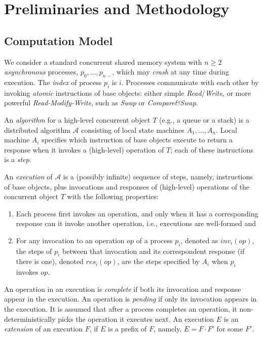 \chapter{\label{chapter:preliminaries}Preliminaries and Methodology}

\section{\label{sec:computation-model}Computation Model}

We consider a standard concurrent shared memory system with \(n \ge 2\) \textit{asynchronous} processes, \(p_0, \ldots, p_{n-}\), which may \textit{crash} at any time during execution. The \textit{index} of process \(p_i\) is \(i\). Processes communicate with each other by invoking \textit{atomic} instructions of base objects: either simple \emph{Read}/\emph{Write}, or more powerful \emph{Read-Modify-Write}, such as \emph{Swap} or \emph{Compare\&Swap}.

An \emph{algorithm} for a high-level concurrent object \(T\) (e.g., a queue or a stack) is a distributed algorithm \(\mathcal{A}\) consisting of local state machines \(A_1,\ldots, A_n\). Local machine \(A_i\) specifies which instruction of base objects execute to return a response when it invokes a (high-level) operation of \(T\); each of these instructions is a \emph{step}.

An \emph{execution} of \(\mathcal{A}\) is a (possibly infinite) sequence of steps, namely, instructions of base objects, plus invocations and responses of (high-level) operations of the concurrent object \(T\) with the following properties:

\begin{enumerate}
    \item Each process first invokes an operation, and only when it has a corresponding response can it invoke another operation, i.e., executions are well-formed and
    \item For any invocation to an operation \(op\) of a process \(p_i\), denoted as \(inv_i(op)\), the steps of \(p_i\) between that invocation and its correspondent response (if there is one), denoted \(res_i(op)\), are the steps specified by \(A_i\) when \(p_i\) invokes \(op\).
\end{enumerate}

An operation in an execution is \emph{complete} if both its invocation and response appear in the execution. An operation is \emph{pending} if only its invocation appears in the execution. It is assumed that after a process completes an operation, it non-deterministically picks the operation it executes next. An execution \(E\) is an \emph{extension} of an execution \(F\), if \(E\) is a prefix of \(F\), namely, \(E = F\cdot F'\) for some \(F'\).

